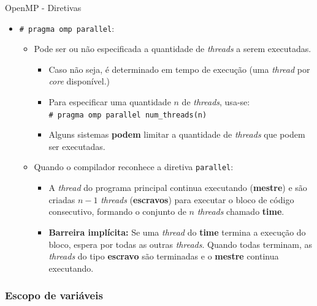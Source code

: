 \begin{frame}{OpenMP - Diretivas}
	\begin{itemize}
		\item \texttt{\# pragma omp parallel}:
		\medskip
		\begin{itemize}
			\item Pode ser ou não especificada a quantidade de \textit{threads} a serem executadas.
			\smallskip
			\begin{itemize}
				\item Caso não seja, é determinado em tempo de execução (uma \textit{thread} por \textit{core} disponível.)
				\smallskip
				\item Para especificar uma quantidade $n$ de \textit{threads}, usa-se: \\ \texttt{\# pragma omp parallel num\_threads(n)}
				\smallskip
				\item Alguns sistemas \textbf{podem} limitar a quantidade de \textit{threads} que podem ser executadas.
			\end{itemize}
			\medskip
			\pause
			\item Quando o compilador reconhece a diretiva \texttt{parallel}:
			\begin{itemize}
				\item A \textit{thread} do programa principal continua executando (\textbf{mestre}) e são criadas $n-1$ \textit{threads} (\textbf{escravos}) para executar o bloco de código consecutivo, formando o conjunto de $n$ \textit{threads} chamado \textbf{time}.
				\smallskip
				\item \textbf{Barreira implícita:} Se uma \textit{thread} do \textbf{time} termina a execução do bloco, espera por todas as outras \textit{threads}. Quando todas terminam, as \textit{threads} do tipo \textbf{escravo} são terminadas e o \textbf{mestre} continua executando.
			\end{itemize}
		\end{itemize}
	\end{itemize}
\end{frame}

\subsubsection{Escopo de variáveis}

